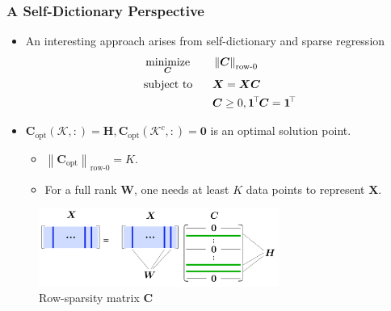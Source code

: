 \documentclass[10pt,xcolor={usenames,dvipsnames,table}]{beamer}
\def\blue{\color{blue}}
\newcommand{\norm}[1]{\left\lVert#1\right\rVert}
\newcommand{\T}{\!\top\!}
\DeclareMathOperator*{\minimize}{minimize}
\newcommand{\citep}[1]{{\blue \scriptsize \parencite{#1}}}
\begin{document}
\begin{frame}
    \frametitle{A Self-Dictionary Perspective}

    \begin{itemize}
        \item An interesting approach arises from self-dictionary and sparse regression \citep{iordache2014collaborative,esser2012convex,recht2012factoring,Elhamifar2012}
    \begin{alignat*}{2}
        & \minimize_{\bm{C}} \quad && \norm{\bm{C}}_{\text{row-}0}  \\
        & \text{\rm subject to} && \bm{X} = \bm{X} \bm{C} \\
        &&& \bm{C} \geq 0, \bm{1}^{\T}\bm{C} = \bm{1}^{\T}
    \end{alignat*}

        \item $\bm{C}_{\text{opt}}(\mathcal{K}, :) = \bm{H}, \bm{C}_{\text{opt}}(\mathcal{K}^{c}, :) = \bm{0}$ is an optimal solution point.
        \begin{itemize}
        \item $\norm{\bm{C}_\text{opt}}_{\text{row-}0} = K$.
        \item For a full rank $\bm{W}$, one needs at least $K$ data points to represent $\bm{X}$.
        \end{itemize}
    \end{itemize}

    \begin{figure}
        \centering
        \includegraphics[width=0.7\textwidth]{figures/sdmmv_demo/demo.png}
        \caption*{Row-sparsity matrix $\bm{C}$ }
    \end{figure}


\end{frame}
\end{document}

